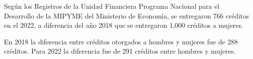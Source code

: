 Según los Registros de la Unidad Financiera Programa Nacional para el Desarrollo de la MIPYME del Ministerio de Economía, se entregaron 766 créditos en el 2022, a diferencia del año 2018 que se entregaron 1,000 créditos a mujeres.

En 2018 la diferencia entre créditos otorgados a hombres y mujeres fue de 288 créditos. Para 2022 la diferencia fue de 291 créditos entre hombres y mujeres. 